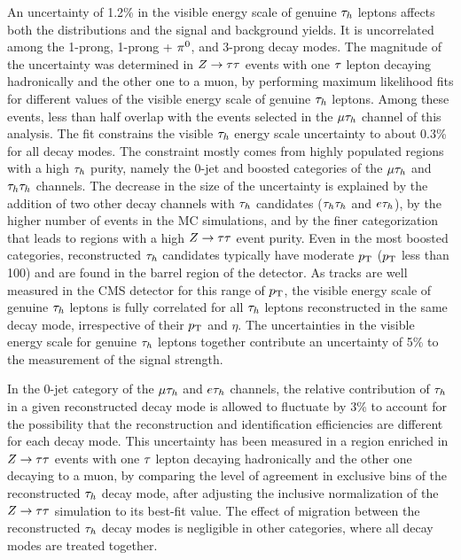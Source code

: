 An uncertainty of 1.2\% in the visible energy scale of genuine $\tau_{h}$ leptons affects both the distributions and the
signal and background yields. It is uncorrelated among the 1-prong, 1-prong + $\pi^{0}$, and
3-prong decay modes.
The magnitude of the uncertainty was determined in $Z\to\tau\tau$ events with one $\tau$ lepton decaying hadronically and the other one to a muon, by performing maximum likelihood fits for different values of the visible energy scale of genuine $\tau_{h}$ leptons. Among these events, less than half overlap with the events selected in the $\mu\tau_{h}$ channel of this analysis. The fit constrains the visible $\tau_{h}$ energy scale uncertainty to about
0.3\% for all decay modes. The constraint mostly comes from highly populated regions with a high $\tau_{h}$ purity, namely the 0-jet and boosted categories of the $\mu\tau_{h}$ and $\tau_{h}\tau_{h}$ channels. The decrease in the size of the uncertainty is explained by the addition of two other decay channels
with $\tau_{h}$ candidates ($\tau_{h}\tau_{h}$ and $e\tau_{h}$), by the higher number of events in the MC simulations, and by the finer categorization that leads to regions with a high $Z\to\tau\tau$ event purity.
Even in the most boosted categories, reconstructed $\tau_{h}$ candidates typically have moderate $p_\mathrm{T}$ ($p_\mathrm{T}$ less than 100\GeV) and are
found in the barrel region of the detector. As tracks are well measured in the CMS detector for this range of $p_\mathrm{T}$,
the visible energy scale of genuine $\tau_{h}$ leptons is fully correlated for all $\tau_{h}$ leptons reconstructed in the same decay mode, irrespective of their $p_\mathrm{T}$ and $\eta$. The uncertainties in the visible energy scale for genuine $\tau_{h}$ leptons together contribute an uncertainty of 5\% to the measurement of the signal strength.

In the 0-jet category of the $\mu\tau_{h}$ and $e\tau_{h}$ channels, the relative contribution of $\tau_{h}$ in a given
reconstructed decay mode is allowed to fluctuate by 3\% to account for the possibility that the reconstruction and
identification efficiencies are different for each decay mode. This uncertainty has been measured in a region enriched in $Z\to\tau\tau$ events with one $\tau$ lepton decaying hadronically and the other one decaying to a muon, by comparing the level of agreement in exclusive bins of the reconstructed $\tau_{h}$ decay mode, after adjusting the inclusive normalization of the $Z\to\tau\tau$ simulation to its best-fit value. The effect of migration between the reconstructed $\tau_{h}$ decay modes is negligible in other categories, where
all decay modes are treated together.

